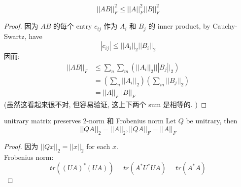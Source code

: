 \begin{proposition}
    \begin{equation}
        ||AB||^2_F \leq ||A||^2_F ||B||^2_F
    \end{equation}
\end{proposition}
\begin{proof}
    因为 $AB$ 的每个 entry $c_{ij}$ 作为 $A_i$ 和 $B_j$ 的 inner product, by Cauchy-Swartz, have 
    $$
    |c_{ij}| \leq ||A_i||_2 ||B_i||_2
    $$
因而:
\begin{align}
    ||AB||_F  &\leq \sum_n \sum_m (||A_i||_2 |||B_j||_2) \\ 
    & = (\sum_n ||A_i||_2)(\sum_m ||B_j||_2) \\
    & = ||A||_F ||B||_F
\end{align}
(虽然这看起来很不对, 但容易验证, 这上下两个 sum 是相等的. )
\end{proof}

\begin{theorem}{unitrary matrix preserves 2-norm 和 Frobenius norm}
    Let $Q $ be unitrary, then
    $$
    ||QA||_2 = ||A||_2, ||QA||_F = ||A||_F
    $$
\end{theorem}
\begin{proof}
    因为 $||Qx||_2 = ||x||_2$ for each $x$. \\
    Frobenius norm: 
    $$
    tr((UA)^*(UA) ) = tr(A^*U^*UA) = tr(A^*A) 
    $$
\end{proof}








